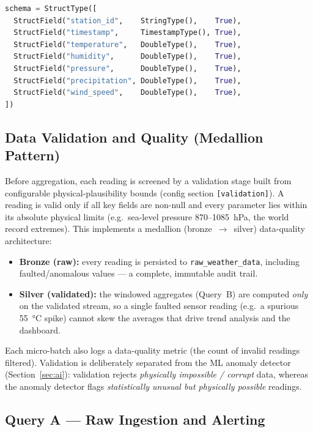 \documentclass[conference,a4paper]{IEEEtran}
\begin{document}
\begin{lstlisting}[language=Python, caption=Spark schema for incoming readings]
schema = StructType([
  StructField("station_id",    StringType(),    True),
  StructField("timestamp",     TimestampType(), True),
  StructField("temperature",   DoubleType(),    True),
  StructField("humidity",      DoubleType(),    True),
  StructField("pressure",      DoubleType(),    True),
  StructField("precipitation", DoubleType(),    True),
  StructField("wind_speed",    DoubleType(),    True),
])
\end{lstlisting}

\subsection{Data Validation and Quality (Medallion Pattern)}

Before aggregation, each reading is screened by a validation stage built from
configurable physical-plausibility bounds (config section \texttt{[validation]}).
A reading is valid only if all key fields are non-null and every parameter lies
within its absolute physical limits (e.g.\ sea-level pressure
870--1085~hPa, the world record extremes). This implements a medallion
(bronze~$\rightarrow$~silver) data-quality architecture:

\begin{itemize}
  \item \textbf{Bronze (raw):} every reading is persisted to
        \texttt{raw\_weather\_data}, including faulted/anomalous values --- a
        complete, immutable audit trail.
  \item \textbf{Silver (validated):} the windowed aggregates (Query~B) are
        computed \emph{only} on the validated stream, so a single faulted sensor
        reading (e.g.\ a spurious 55~°C spike) cannot skew the
        averages that drive trend analysis and the dashboard.
\end{itemize}

Each micro-batch also logs a data-quality metric (the count of invalid readings
filtered). Validation is deliberately separated from the ML anomaly detector
(Section~\ref{sec:ai}): validation rejects \emph{physically impossible / corrupt}
data, whereas the anomaly detector flags \emph{statistically unusual but
physically possible} readings.

\subsection{Query A --- Raw Ingestion and Alerting}
\end{document}
